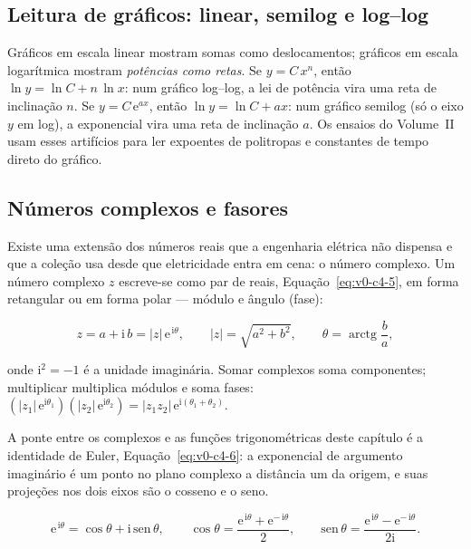 \documentclass[12pt,a4paper]{article}
\numberwithin{equation}{section}
\numberwithin{table}{section}
\numberwithin{figure}{section}
\begin{document}
\subsection{Leitura de gráficos: linear, semilog e log--log}

Gráficos em escala linear mostram somas como deslocamentos; gráficos em
escala logarítmica mostram \emph{potências como retas}. Se
$y = C\,x^n$, então $\ln y = \ln C + n\,\ln x$: num gráfico log--log, a
lei de potência vira uma reta de inclinação $n$. Se
$y = C\,\mathrm{e}^{a x}$, então $\ln y = \ln C + a x$: num gráfico
semilog (só o eixo $y$ em log), a exponencial vira uma reta de inclinação
$a$. Os ensaios do Volume~II usam esses artifícios para ler expoentes de
politropas e constantes de tempo direto do gráfico.

\subsection{Números complexos e fasores}

Existe uma extensão dos números reais que a engenharia elétrica não
dispensa e que a coleção usa desde que eletricidade entra em cena: o número
complexo. Um número complexo $z$ escreve-se como par de reais,
Equação~\eqref{eq:v0-c4-5}, em forma retangular ou em forma polar --- módulo
e ângulo (fase):

\begin{equation}\label{eq:v0-c4-5}
z = a + \mathrm{i}\,b
  = \lvert z\rvert\,\mathrm{e}^{\,\mathrm{i}\theta},
\qquad
\lvert z\rvert = \sqrt{a^2 + b^2},
\qquad
\theta = \operatorname{arctg}\frac{b}{a},
\end{equation}

onde $\mathrm{i}^2 = -1$ é a unidade imaginária. Somar complexos soma
componentes; multiplicar multiplica módulos e soma fases:
$(\lvert z_1\rvert\,\mathrm{e}^{\mathrm{i}\theta_1})
(\lvert z_2\rvert\,\mathrm{e}^{\mathrm{i}\theta_2}) =
\lvert z_1 z_2\rvert\,\mathrm{e}^{\mathrm{i}(\theta_1+\theta_2)}$.

A ponte entre os complexos e as funções trigonométricas deste capítulo é a
identidade de Euler, Equação~\eqref{eq:v0-c4-6}: a exponencial de argumento
imaginário é um ponto no plano complexo a distância um da origem, e suas
projeções nos dois eixos são o cosseno e o seno.

\begin{equation}\label{eq:v0-c4-6}
\mathrm{e}^{\,\mathrm{i}\theta} = \cos\theta + \mathrm{i}\,\mathrm{sen}\,\theta,
\qquad
\cos\theta = \frac{\mathrm{e}^{\,\mathrm{i}\theta} + \mathrm{e}^{-\,\mathrm{i}\theta}}{2},
\qquad
\mathrm{sen}\,\theta = \frac{\mathrm{e}^{\,\mathrm{i}\theta} - \mathrm{e}^{-\,\mathrm{i}\theta}}{2\mathrm{i}}.
\end{equation}
\end{document}
